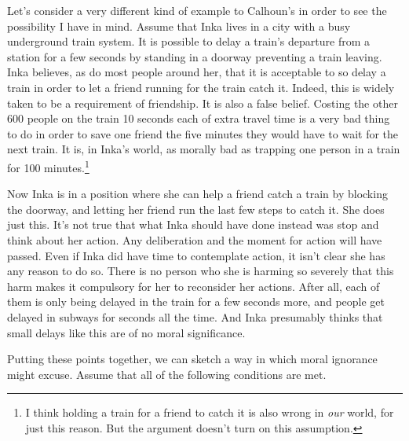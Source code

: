Let's consider a very different kind of example to Calhoun's in order to see the possibility I have in mind. Assume that \gls{Inka} lives in a city with a busy underground train system. It is possible to delay a train's departure from a station for a few seconds by standing in a doorway preventing a train leaving. \gls{Inka} believes, as do most people around her, that it is acceptable to so delay a train in order to let a friend running for the train catch it. Indeed, this is widely taken to be a requirement of friendship. It is also a false belief. Costing the other 600 people on the train 10 seconds each of extra travel time is a very bad thing to do in order to save one friend the five minutes they would have to wait for the next train. It is, in \gls{Inka}'s world, as morally bad as trapping one person in a train for 100 minutes.\footnote{I think holding a train for a friend to catch it is also wrong in \emph{our} world, for just this reason. But the argument doesn't turn on this assumption.}

Now \gls{Inka} is in a position where she can help a friend catch a train by blocking the doorway, and letting her friend run the last few steps to catch it. She does just this. It's not true that what \gls{Inka} should have done instead was stop and think about her action. Any deliberation and the moment for action will have passed. Even if \gls{Inka} did have time to contemplate action, it isn't clear she has any reason to do so. There is no person who she is harming so severely that this harm makes it compulsory for her to reconsider her actions. After all, each of them is only being delayed in the train for a few seconds more, and people get delayed in subways for seconds all the time. And \gls{Inka} presumably thinks that small delays like this are of no moral significance.

Putting these points together, we can sketch a way in which moral ignorance might excuse. Assume that all of the following conditions are met.

